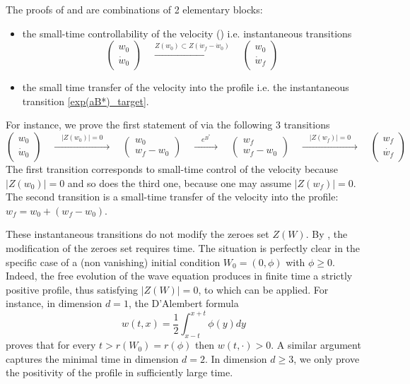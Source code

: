 \documentclass[a4paper]{article}
\theoremstyle{plain}
\begin{document}
The proofs of  and  are combinations of 2 elementary blocks:
\begin{itemize}[topsep=0cm, parsep=0cm, itemsep=0cm]
\item the small-time controllability of the velocity 
() i.e. instantaneous transitions
$$\begin{pmatrix}
    w_0 \\ \dot{w}_0
\end{pmatrix}
\quad 
\xrightarrow[]{Z(w_0) \subset Z(\dot{w}_f-\dot{w}_0)} 
\quad
 \begin{pmatrix}
    w_0 \\ \dot{w}_f
\end{pmatrix}$$
%
\item the small time transfer of the velocity into the profile i.e. the instantaneous transition \eqref{exp(aB*)_target}.
\end{itemize}
For instance, we prove the first statement of  via the following 3 transitions
$$\begin{pmatrix}
    w_0 \\ \dot{w}_0
\end{pmatrix}
\quad \xrightarrow[]{\quad |Z(w_0)|=0 \quad } \quad
\begin{pmatrix}
    w_0 \\ w_f-w_0
\end{pmatrix}
\quad \xrightarrow[]{\quad e^{B^*} \quad } \quad
\begin{pmatrix}
    w_f \\ w_f-w_0
\end{pmatrix}
\quad \xrightarrow[]{\quad |Z(w_f)|=0 \quad} \quad
\begin{pmatrix}
    w_f \\ \dot{w_f}
\end{pmatrix}$$
The first transition corresponds to small-time control of the velocity because $|Z(w_0)|=0$ and so does the third one, because one may assume $|Z(w_f)|=0$. The second transition is a small-time transfer of the velocity into the profile: $w_f=w_0+(w_f-w_0)$.


These instantaneous transitions do not modify the zeroes set $Z(W)$. By , the modification of the zeroes set requires time. The situation is perfectly clear in the specific case of a (non vanishing) initial condition $W_0=(0,\phi)$ with $\phi\geq 0$. Indeed, the free evolution of the wave equation produces in finite time a strictly positive profile, thus satisfying $|Z(W)|=0$, to which  can be applied. For instance, in dimension $d=1$, the D'Alembert formula
$$w(t,x)=\frac{1}{2}\int_{x-t}^{x+t}\phi(y)dy$$
proves that for every $t>r(W_0)=r(\phi)$ then $w(t,\cdot)>0$. 
A similar argument captures the minimal time in dimension $d=2$. In dimension $d \geq 3$, we only prove the positivity of the profile in sufficiently large time.
 
\end{document}
